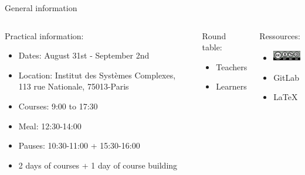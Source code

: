 \documentclass{beamer}
\begin{document}
\begin{frame}{General information}
\begin{columns}
\begin{block}{Practical information:}
\begin{itemize}
    \item Dates: August 31st - September 2nd
    \item Location: Institut des Systèmes Complexes, 113 rue Nationale, 75013-Paris
    \item Courses: 9:00 to 17:30
    \item Meal: 12:30-14:00
    \item Pauses: 10:30-11:00 + 15:30-16:00
    \item 2 days of courses + 1 day of course building
\end{itemize}
\end{block}
\begin{block}{Round table:}
    \begin{itemize}
        \item Teachers 
        \item Learners
    \end{itemize}
\end{block}
\begin{block}{Ressources:}
    \begin{itemize}
        \item \includegraphics[height=0.5cm]{shared/CC-by-nc-sa.png}
        \item GitLab
        \item \LaTeX
    \end{itemize}
\end{block}
\end{columns}
\end{frame}
\end{document}
